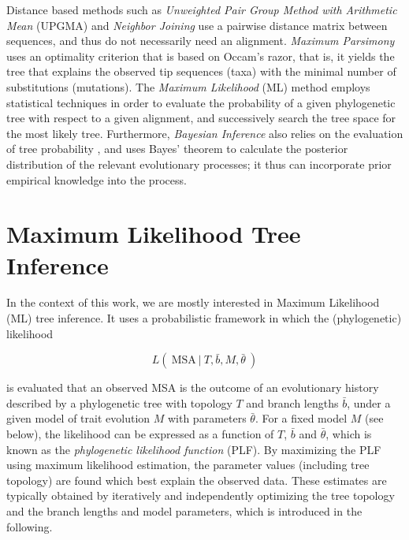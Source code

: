 Distance based methods such as \emph{Unweighted Pair Group Method with Arithmetic Mean} (UPGMA) \cite{Sokal1958}
and \emph{Neighbor Joining} \cite{Saitou1987}
use a pairwise distance matrix between sequences, and thus do not necessarily need an alignment.
\emph{Maximum Parsimony} \cite{Sankoff1975} uses an optimality criterion that is based on Occam's razor,
that is, it yields the tree that explains the observed tip sequences (taxa)
with the minimal number of substitutions (mutations).
The \emph{Maximum Likelihood} (ML) method \cite{Felsenstein1981} employs statistical techniques
in order to evaluate the probability of a given phylogenetic tree with respect to a given alignment,
and successively search the tree space for the most likely tree.
Furthermore, \emph{Bayesian Inference} also relies on the evaluation of tree probability \cite{Yang2006},
and uses Bayes' theorem to calculate the posterior distribution of the relevant evolutionary processes;
it thus can incorporate prior empirical knowledge into the process.


\section{Maximum Likelihood Tree Inference}
\label{ch:Foundations:sec:MLTreeInference}

In the context of this work, we are mostly interested in Maximum Likelihood (ML) tree inference.
It uses a probabilistic framework in which the (phylogenetic) likelihood

\begin{equation}
    L(~ \mbox{MSA} ~|~ T, \bar{b}, M, \bar{\theta} ~)
\end{equation}

is evaluated that an observed MSA is the outcome of an evolutionary history described by a phylogenetic tree
with topology $T$ and branch lengths $\bar{b}$, under a given model of trait evolution $M$ with parameters $\bar{\theta}$.
For a fixed model $M$ (see below), the likelihood can be expressed as a function of $T$, $\bar{b}$ and $\bar{\theta}$,
which is known as the \emph{phylogenetic likelihood function} (PLF).
By maximizing the PLF using maximum likelihood estimation,
the parameter values (including tree topology) are found which best explain the observed data.
These estimates are typically obtained by iteratively and independently optimizing
the tree topology and the branch lengths and model parameters,
which is introduced in the following.

